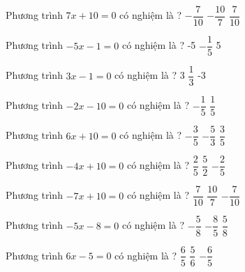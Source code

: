 \begin{ex} 
 Phương trình $7x+10=0$ có nghiệm là ? 
 {$- \dfrac{ 7 }{ 10 } $} 
 {\True $- \dfrac{ 10 }{ 7 } $} 
 {$ \dfrac{ 7 }{ 10 } $}  
 \loigiai{} 
 \end{ex} 
 
\begin{ex} 
 Phương trình $-5x-1=0$ có nghiệm là ? 
 {-5} 
 {\True $- \dfrac{ 1 }{ 5 } $} 
 {5}  
 \loigiai{} 
 \end{ex} 
 
\begin{ex} 
 Phương trình $3x-1=0$ có nghiệm là ? 
 {3} 
 {\True $ \dfrac{ 1 }{ 3 } $} 
 {-3}  
 \loigiai{} 
 \end{ex} 
 
\begin{ex} 
 Phương trình $-2x-10=0$ có nghiệm là ? 
 {$- \dfrac{ 1 }{ 5 } $} 
 {} 
 {$ \dfrac{ 1 }{ 5 } $}  
 \loigiai{} 
 \end{ex} 
 
\begin{ex} 
 Phương trình $6x+10=0$ có nghiệm là ? 
 {$- \dfrac{ 3 }{ 5 } $} 
 {\True $- \dfrac{ 5 }{ 3 } $} 
 {$ \dfrac{ 3 }{ 5 } $}  
 \loigiai{} 
 \end{ex} 
 
\begin{ex} 
 Phương trình $-4x+10=0$ có nghiệm là ? 
 {$ \dfrac{ 2 }{ 5 } $} 
 {\True $ \dfrac{ 5 }{ 2 } $} 
 {$- \dfrac{ 2 }{ 5 } $}  
 \loigiai{} 
 \end{ex} 
 
\begin{ex} 
 Phương trình $-7x+10=0$ có nghiệm là ? 
 {$ \dfrac{ 7 }{ 10 } $} 
 {\True $ \dfrac{ 10 }{ 7 } $} 
 {$- \dfrac{ 7 }{ 10 } $}  
 \loigiai{} 
 \end{ex} 
 
\begin{ex} 
 Phương trình $-5x-8=0$ có nghiệm là ? 
 {$- \dfrac{ 5 }{ 8 } $} 
 {\True $- \dfrac{ 8 }{ 5 } $} 
 {$ \dfrac{ 5 }{ 8 } $}  
 \loigiai{} 
 \end{ex} 
 
\begin{ex} 
 Phương trình $6x-5=0$ có nghiệm là ? 
 {$ \dfrac{ 6 }{ 5 } $} 
 {\True $ \dfrac{ 5 }{ 6 } $} 
 {$- \dfrac{ 6 }{ 5 } $}  
 \loigiai{} 
 \end{ex} 
 
